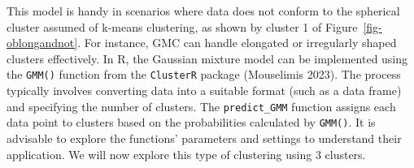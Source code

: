 This model is handy in scenarios where data does not conform to the
spherical cluster assumed of k-means clustering, as shown by cluster 1 of
Figure~\ref{fig-oblongandnot}. For instance, GMC can handle
elongated or irregularly shaped clusters effectively. In R, the Gaussian mixture
model can be implemented using the \texttt{GMM()} function from the
\texttt{ClusterR} package (Mouselimis 2023). The process typically
involves converting data into a suitable format (such as a data frame) and
specifying the number of clusters. The \texttt{predict\_GMM}
function assigns each data point to clusters based on the probabilities
calculated by \texttt{GMM()}. It is advisable to explore the functions'
parameters and settings to understand their application. We will now explore
this type of clustering using 3 clusters.

\begin{Shaded}
\begin{Highlighting}[]

\OtherTok{\textless{}{-}} \SpecialCharTok{\%\textgreater{}\%}
                  \NormalTok{() }\SpecialCharTok{\%\textgreater{}\%}
                  \NormalTok{() }\SpecialCharTok{\%\textgreater{}\%}
                  \NormalTok{()}

\OtherTok{\textless{}{-}} 

\OtherTok{\textless{}{-}} 
                  \NormalTok{, } \NormalTok{,}
                  \NormalTok{, } \NormalTok{, } \NormalTok{,}
                  \NormalTok{, } \NormalTok{)}

\OtherTok{\textless{}{-}} \SpecialCharTok{$}
                          \SpecialCharTok{$}
                          \SpecialCharTok{$}\SpecialCharTok{$}


\end{Highlighting}
\end{Shaded}
